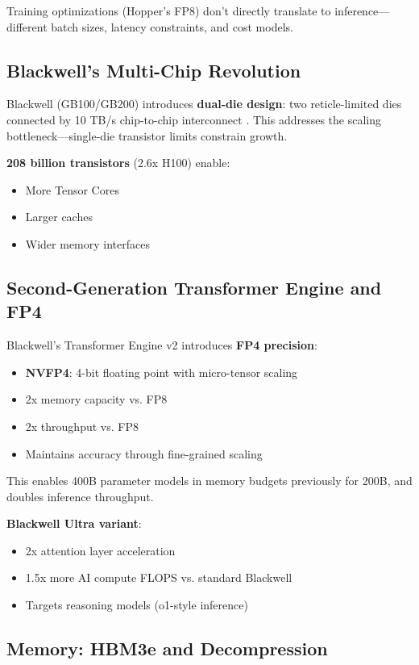 \documentclass{article}
\begin{document}
Training optimizations (Hopper's FP8) don't directly translate to inference—different batch sizes, latency constraints, and cost models.

\subsection{Blackwell's Multi-Chip Revolution}

Blackwell (GB100/GB200) introduces \textbf{dual-die design}: two reticle-limited dies connected by 10 TB/s chip-to-chip interconnect \cite{nvidia2024blackwell}. This addresses the scaling bottleneck—single-die transistor limits constrain growth.

\textbf{208 billion transistors} (2.6x H100) enable:
\begin{itemize}
\item More Tensor Cores
\item Larger caches
\item Wider memory interfaces
\end{itemize}

\subsection{Second-Generation Transformer Engine and FP4}

Blackwell's Transformer Engine v2 introduces \textbf{FP4 precision}:
\begin{itemize}
\item \textbf{NVFP4}: 4-bit floating point with micro-tensor scaling
\item 2x memory capacity vs. FP8
\item 2x throughput vs. FP8
\item Maintains accuracy through fine-grained scaling
\end{itemize}

This enables 400B parameter models in memory budgets previously for 200B, and doubles inference throughput.

\textbf{Blackwell Ultra variant}:
\begin{itemize}
\item 2x attention layer acceleration
\item 1.5x more AI compute FLOPS vs. standard Blackwell
\item Targets reasoning models (o1-style inference)
\end{itemize}

\subsection{Memory: HBM3e and Decompression}
\end{document}
